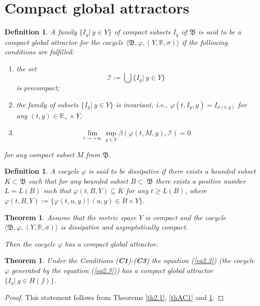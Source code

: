 \documentclass{amsart}%
\newtheorem{theorem}[lemma]{Theorem}
\newtheorem{definition}[lemma]{Definition}
\begin{document}
\section{Compact global attractors}\label{Sec5}

\begin{definition}\label{defCGA0_1} A family $\{I_{y}|\ y\in Y\}$ of
compact subsets $I_{y}$ of $\mathfrak B$ is said to be a compact
global attractor for the cocycle $\langle \mathfrak
B,\varphi,(Y,\mathbb R,\sigma)\rangle$ if the following conditions
are fulfilled:
\begin{enumerate}
\item the set
\begin{equation}\label{eqCGA1}
\mathcal I :=\bigcup \{I_{y}|\ y\in Y\}\nonumber
\end{equation}
is precompact; \item the family of subsets $\{I_{y}|\ y\in Y\}$ is
invariant, i.e., $\varphi(t,I_{y},y)=I_{\sigma(t,y)}$ for any
$(t,y)\in \mathbb R_{+}\times Y$; \item
\begin{equation}\label{eqCGA2}
\lim\limits_{t\to +\infty}\sup\limits_{y\in
Y}\beta(\varphi(t,M,y),\mathcal I)=0\nonumber
\end{equation}
\end{enumerate}
for any compact subset $M$ from $\mathfrak B$.
\end{definition}


\begin{definition}\label{defCGA1} A cocycle $\varphi$ is said to be
dissipative if there exists a bounded subset $K\subset \mathfrak
B$ such that for any bounded subset $B\subset \ \mathfrak B$ there
exists a positive number $L=L(B)$ such that
$\varphi(t,B,Y)\subseteq K$ for any $t\ge L(B)$, where
$\varphi(t,B,Y):=\{\varphi(t,u,y)|\ (u,y)\in B\times Y\}$.
\end{definition}


\begin{theorem}\label{thCGA1} \cite[Ch.II]{Che_2024} Assume that the metric space $Y$ is
compact and the cocycle $\langle \mathfrak B,\varphi,(Y,\mathbb
R,\sigma)\rangle$ is dissipative and asymptotically compact.

Then the cocycle $\varphi$ has a compact global attractor.
\end{theorem}

\begin{theorem}\label{thCGA2} Under the Conditions
(\textbf{C1})-(\textbf{C3}) the equation (\ref{eq2.3}) (the
cocycle $\varphi$ generated by the equation (\ref{eq2.3})) has a
compact global attractor $\{I_{g}|\ g\in H(f)\}$.
\end{theorem}
\begin{proof} This statement follows from Theorems \ref{th2.1},
\ref{thAC1} and \ref{thCGA1}.
\end{proof}
\end{document}
